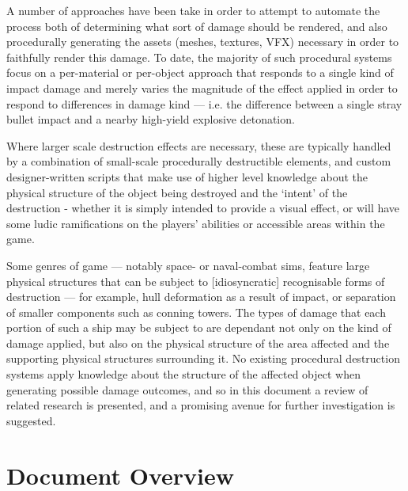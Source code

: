 \documentclass[11pt]{report}
\begin{document}
	A number of approaches have been take in order to attempt to automate the process both of determining what sort of damage should be rendered, and also procedurally generating the assets (meshes, textures, VFX) necessary in order to faithfully render this damage. To date, the majority of such procedural systems focus on a per-material or per-object approach that responds to a single kind of impact damage and merely varies the magnitude of the effect applied in order to respond to differences in damage kind --- i.e. the difference between a single stray bullet impact and a nearby high-yield explosive detonation.

	Where larger scale destruction effects are necessary, these are typically handled by a combination of small-scale procedurally destructible elements, and custom designer-written scripts that make use of higher level knowledge about the physical structure of the object being destroyed and the `intent' of the destruction - whether it is simply intended to provide a visual effect, or will have some ludic ramifications on the players' abilities or accessible areas within the game.

	Some genres of game --- notably space- or naval-combat sims, feature large physical structures that can be subject to [idiosyncratic] recognisable forms of destruction --- for example, hull deformation as a result of impact, or separation of smaller components such as conning towers. The types of damage that each portion of such a ship may be subject to are dependant not only on the kind of damage applied, but also on the physical structure of the area affected and the supporting physical structures surrounding it. No existing procedural destruction systems apply knowledge about the structure of the affected object when generating possible damage outcomes, and so in this document a review of related research is presented, and a promising avenue for further investigation is suggested.

	\section{Document Overview}
\end{document}
